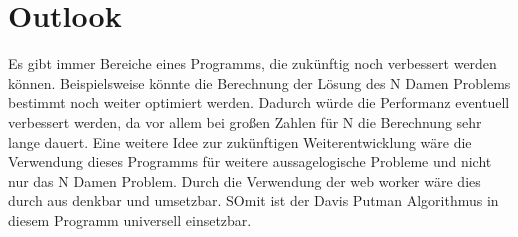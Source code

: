 \section{Outlook} 
Es gibt immer Bereiche eines Programms, die zukünftig noch verbessert werden können. Beispielsweise könnte die Berechnung der Lösung des N Damen Problems bestimmt noch weiter optimiert werden. Dadurch würde die Performanz eventuell verbessert werden, da vor allem bei großen Zahlen für N die Berechnung sehr lange dauert. 
Eine weitere Idee zur zukünftigen Weiterentwicklung wäre die Verwendung dieses Programms für weitere aussagelogische Probleme und nicht nur das N Damen Problem. Durch die Verwendung der web worker wäre dies durch aus denkbar und umsetzbar. SOmit ist der Davis Putman Algorithmus in diesem Programm universell einsetzbar.